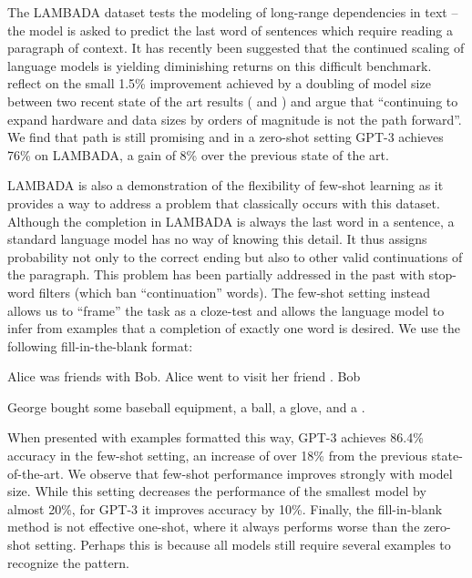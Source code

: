 \documentclass{article}
\begin{document}
The LAMBADA dataset \cite{paperno2016lambada} tests the modeling of long-range dependencies in text -- the model is asked to predict the last word of sentences which require reading a paragraph of context. It has recently been suggested that the continued scaling of language models is yielding diminishing returns on this difficult benchmark. \cite{bisk2020experience} reflect on the small 1.5\% improvement achieved by a doubling of model size between two recent state of the art results (\cite{shoeybi2019megatronlm} and \cite{turing_17m}) and argue that ``continuing to expand hardware and data sizes by orders of magnitude is not the path forward''. We find that path is still promising and in a zero-shot setting GPT-3 achieves 76\% on LAMBADA, a gain of 8\% over the previous state of the art.

LAMBADA is also a demonstration of the flexibility of few-shot learning as it provides a way to address a problem that classically occurs with this dataset. Although the completion in LAMBADA is always the last word in a sentence, a standard language model has no way of knowing this detail. It thus assigns probability not only to the correct ending but also to other valid continuations of the paragraph. This problem has been partially addressed in the past with stop-word filters \cite{radford2019language} (which ban ``continuation'' words). The few-shot setting instead allows us to ``frame'' the task as a cloze-test and allows the language model to infer from examples that a completion of exactly one word is desired. We use the following fill-in-the-blank format:

\hspace{3cm}Alice was friends with Bob.  Alice went to visit her friend \underline{\hspace{1cm}}.  Bob

\hspace{3cm}George bought some baseball equipment, a ball, a glove, and a \underline{\hspace{1cm}}.  

When presented with examples formatted this way, GPT-3 achieves 86.4\% accuracy in the few-shot setting, an increase of over 18\% from the previous state-of-the-art. We observe that few-shot performance improves strongly with model size. While this setting decreases the performance of the smallest model by almost 20\%, for GPT-3 it improves accuracy by 10\%. Finally, the fill-in-blank method is not effective one-shot, where it always performs worse than the zero-shot setting. Perhaps this is because all models still require several examples to recognize the pattern.
\end{document}
